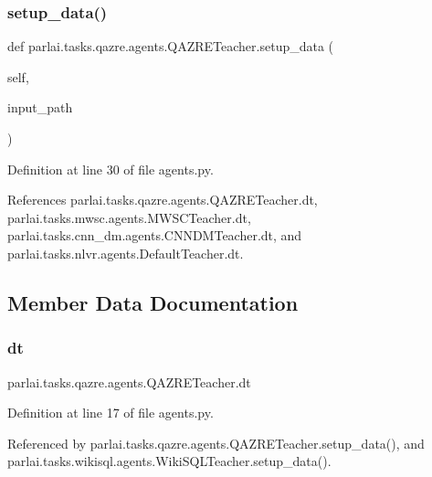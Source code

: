 \subsubsection{\texorpdfstring{setup\+\_\+data()}{setup\_data()}}
{\footnotesize\ttfamily def parlai.\+tasks.\+qazre.\+agents.\+Q\+A\+Z\+R\+E\+Teacher.\+setup\+\_\+data (\begin{DoxyParamCaption}\item[{}]{self,  }\item[{}]{input\+\_\+path }\end{DoxyParamCaption})}



Definition at line 30 of file agents.\+py.



References parlai.\+tasks.\+qazre.\+agents.\+Q\+A\+Z\+R\+E\+Teacher.\+dt, parlai.\+tasks.\+mwsc.\+agents.\+M\+W\+S\+C\+Teacher.\+dt, parlai.\+tasks.\+cnn\+\_\+dm.\+agents.\+C\+N\+N\+D\+M\+Teacher.\+dt, and parlai.\+tasks.\+nlvr.\+agents.\+Default\+Teacher.\+dt.



\subsection{Member Data Documentation}
\mbox{\label{classparlai_1_1tasks_1_1qazre_1_1agents_1_1QAZRETeacher_a13f7bcf326e3e1961707f1d524135f7a}} 
\subsubsection{\texorpdfstring{dt}{dt}}
{\footnotesize\ttfamily parlai.\+tasks.\+qazre.\+agents.\+Q\+A\+Z\+R\+E\+Teacher.\+dt}



Definition at line 17 of file agents.\+py.



Referenced by parlai.\+tasks.\+qazre.\+agents.\+Q\+A\+Z\+R\+E\+Teacher.\+setup\+\_\+data(), and parlai.\+tasks.\+wikisql.\+agents.\+Wiki\+S\+Q\+L\+Teacher.\+setup\+\_\+data().

\mbox{\label{classparlai_1_1tasks_1_1qazre_1_1agents_1_1QAZRETeacher_a1b30af460c96608da404eeb897a48dbc}} 
